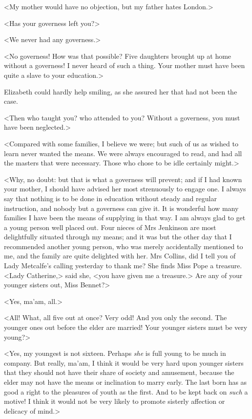 <My mother would have no objection, but my father hates London.>

<Has your governess left you?>

<We never had any governess.>

<No governess! How was that possible? Five daughters brought up at home without a governess! I never heard of such a thing. Your mother must have been quite a slave to your education.>

Elizabeth could hardly help smiling, as she assured her that had not been the case.

<Then who taught you? who attended to you? Without a governess, you must have been neglected.>

<Compared with some families, I believe we were; but such of us as wished to learn never wanted the means. We were always encouraged to read, and had all the masters that were necessary. Those who chose to be idle certainly might.>

<Why, no doubt: but that is what a governess will prevent; and if I had known your mother, I should have advised her most strenuously to engage one. I always say that nothing is to be done in education without steady and regular instruction, and nobody but a governess can give it. It is wonderful how many families I have been the means of supplying in that way. I am always glad to get a young person well placed out. Four nieces of Mrs Jenkinson are most delightfully situated through my means; and it was but the other day that I recommended another young person, who was merely accidentally mentioned to me, and the family are quite delighted with her. Mrs Collins, did I tell you of Lady Metcalfe's calling yesterday to thank me? She finds Miss Pope a treasure. <Lady Catherine,> said she, <you have given me a treasure.> Are any of your younger sisters out, Miss Bennet?>

<Yes, ma'am, all.>

<All! What, all five out at once? Very odd! And you only the second. The younger ones out before the elder are married! Your younger sisters must be very young?>

<Yes, my youngest is not sixteen. Perhaps \textit{she} is full young to be much in company. But really, ma'am, I think it would be very hard upon younger sisters that they should not have their share of society and amusement, because the elder may not have the means or inclination to marry early. The last born has as good a right to the pleasures of youth as the first. And to be kept back on \textit{such} a motive! I think it would not be very likely to promote sisterly affection or delicacy of mind.>

